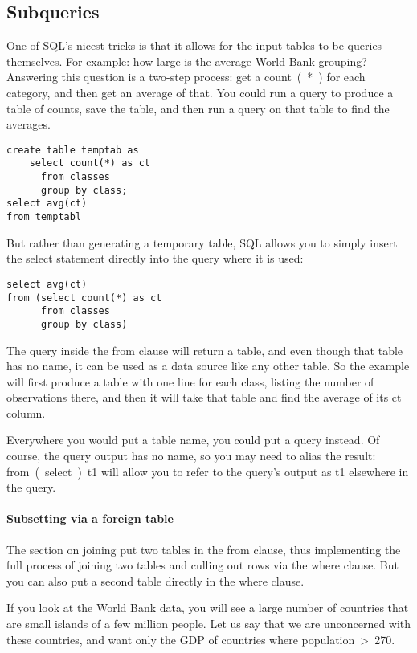\subsection{Subqueries} 
One of SQL's nicest tricks is that it allows for the input tables to be
queries themselves. For example: 
how large is the average World Bank grouping?
Answering this question is a two-step process: 
get a \si{count(*)} for each category, and then get an
average of that. You could run a query to produce a table of counts,
save the table, and then run a query on that table to find the averages.
\begin{lstlisting}
create table temptab as
    select count(*) as ct
      from classes
      group by class;
select avg(ct) 
from temptabl
\end{lstlisting}
But rather than generating a temporary table, SQL allows you to simply
insert the \si{select} statement directly into the query where it is
used:
\begin{lstlisting}
select avg(ct) 
from (select count(*) as ct
      from classes
      group by class)
\end{lstlisting}
The query inside the \si{from} clause will return a table, and even
though that table has no name, it can be used as a data source like any other
table. So the example will first produce a table with one line for each
class, listing the number of observations there, and then it will
take that table and find the average of its \si{ct} column.

Everywhere you would put a table name, you could put a query 
instead. Of course, the query output has no name, so you may need to
alias the result: \si{from (select ...) t1} will allow you to refer to
the query's output as \si{t1} elsewhere in the query.


\paragraph{Subsetting via a foreign table} The section on joining
put two tables in the \si{from} clause, thus implementing the full
process of joining two tables and culling out rows via the \si{where}
clause. But you can also put a second table directly in the \si{where}
clause.

If you look at the World Bank data, you will see a large number of
countries that are small islands of a few million people. Let us say
that we are unconcerned with these countries, and want only the GDP of
countries where \si{population > 270}.

